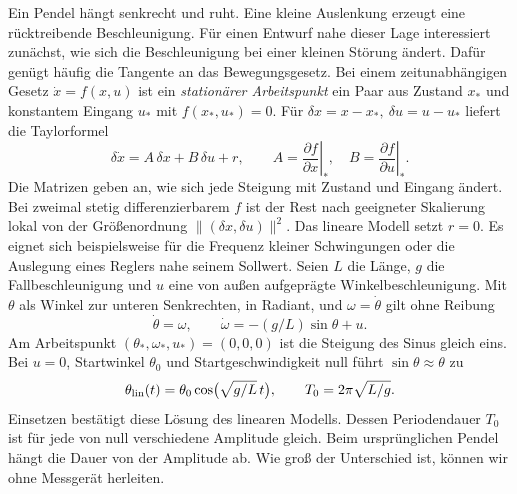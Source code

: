 Ein Pendel hängt senkrecht und ruht. Eine kleine Auslenkung erzeugt eine rücktreibende Beschleunigung. Für einen Entwurf nahe dieser Lage interessiert zunächst, wie sich die Beschleunigung bei einer kleinen Störung ändert. Dafür genügt häufig die Tangente an das Bewegungsgesetz.
Bei einem zeitunabhängigen Gesetz \(\dot x=f(x,u)\) ist ein \emph{stationärer Arbeitspunkt} ein Paar aus Zustand \(x_*\) und konstantem Eingang \(u_*\) mit \(f(x_*,u_*)=0\). Für \(\delta x=x-x_*,\ \delta u=u-u_*\) liefert die Taylorformel
\[
 \delta\dot x=A\,\delta x+B\,\delta u+r,\qquad
 A=\left.\frac{\partial f}{\partial x}\right|_*,\quad
 B=\left.\frac{\partial f}{\partial u}\right|_* .
\]
Die Matrizen geben an, wie sich jede Steigung mit Zustand und Eingang ändert. Bei zweimal stetig differenzierbarem \(f\) ist der Rest nach geeigneter Skalierung lokal von der Größenordnung \(\|(\delta x,\delta u)\|^2\). Das lineare Modell setzt \(r=0\). Es eignet sich beispielsweise für die Frequenz kleiner Schwingungen oder die Auslegung eines Reglers nahe seinem Sollwert.
Seien \(L\) die Länge, \(g\) die Fallbeschleunigung und \(u\) eine von außen aufgeprägte Winkelbeschleunigung. Mit \(\theta\) als Winkel zur unteren Senkrechten, in Radiant, und \(\omega=\dot\theta\) gilt ohne Reibung
\[
 \dot\theta=\omega,\qquad \dot\omega=-(g/L)\sin\theta+u .
\]
Am Arbeitspunkt \((\theta_*,\omega_*,u_*)=(0,0,0)\) ist die Steigung des Sinus gleich eins. Bei \(u=0\), Startwinkel \(\theta_0\) und Startgeschwindigkeit null führt \(\sin\theta\approx\theta\) zu
\[
 \theta_{\rm lin}(t)=\theta_0\cos\!\big(\sqrt{g/L}\,t\big),\qquad
 T_0=2\pi\sqrt{L/g}.
\]
Einsetzen bestätigt diese Lösung des linearen Modells. Dessen Periodendauer \(T_0\) ist für jede von null verschiedene Amplitude gleich. Beim ursprünglichen Pendel hängt die Dauer von der Amplitude ab. Wie groß der Unterschied ist, können wir ohne Messgerät herleiten.

